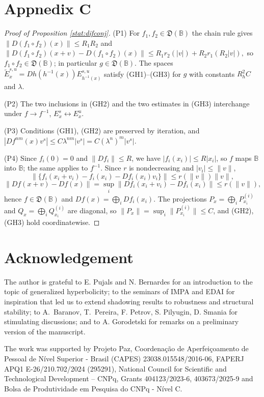 \documentclass[12pt]{article}
\newcommand{\Bb}{\mathbb{B}}
\newcommand{\DUC}{\mathfrak{D}}
\theoremstyle{definition}
\begin{document}
\section*{Appnedix C}
\begin{proof}[Proof of Proposition \ref{stat:difconj}]
{\rm(P1)} For $f_1, f_2 \in \DUC(\Bb)$ the chain rule gives $\|D(f_1 \circ f_2)(x)\| \leq R_1R_2$ and
$
\|D(f_1 \circ f_2)(x+v) - D(f_1 \circ f_2)(x)\| \leq R_1 r_2(|v|) + R_2 r_1(R_2|v|),
$
so $f_1 \circ f_2 \in \DUC(\Bb)$; in particular $g \in \DUC(\Bb)$. The spaces
$\tilde E^{s,u}_x = Dh(h^{-1}(x))E^{s,u}_{h^{-1}(x)}$ satisfy {\rm(GH1)}--{\rm(GH3)} for $g$
with constants $R_h^2C$ and $\lambda$.

{\rm(P2)} The two inclusions in {\rm(GH2)} and the two estimates in {\rm(GH3)} interchange
under $f \to f^{-1}$, $E^s_x \leftrightarrow E^u_x$.

{\rm(P3)} Conditions {\rm(GH1)}, {\rm(GH2)} are preserved by iteration, and
$|Df^{nm}(x)v^s| \leq C\lambda^{nm}|v^s| = C(\lambda^n)^m|v^s|$.

{\rm(P4)} Since $f_i(0) = 0$ and $\|Df_i\| \leq R$, we have $|f_i(x_i)| \leq R|x_i|$, so
$f$ maps $\Bb$ into $\Bb$; the same applies to $f^{-1}$. Since $r$ is nondecreasing and
$|v_i| \leq \|v\|$,
$$
\bigl\|\{f_i(x_i+v_i) - f_i(x_i) - Df_i(x_i)v_i\}\bigr\| \leq r(\|v\|)\|v\|,
$$
$$
\|Df(x+v) - Df(x)\| = \sup_i \|Df_i(x_i+v_i) - Df_i(x_i)\| \leq r(\|v\|),
$$
hence $f \in \DUC(\Bb)$ and $Df(x) = \bigoplus_i Df_i(x_i)$. The projections
$P_x = \bigoplus_i P^{(i)}_{x_i}$ and $Q_x = \bigoplus_i Q^{(i)}_{x_i}$ are diagonal, so
$\|P_x\| = \sup_i \|P^{(i)}_{x_i}\| \leq C$, and {\rm(GH2)}, {\rm(GH3)} hold coordinatewise.
\end{proof}

\section*{Acknowledgement}
The author is grateful to E. Pujals and N. Bernardes for an introduction to the topic of generalized hyperbolicity; to the seminars of IMPA and EDAI for inspiration that led us to extend shadowing results to robustness and structural stability; to A.~Baranov, T.~Pereira, F. Petrov, S. Pilyugin, D. Smania for stimulating discussions; and to A. Gorodetski for remarks on a preliminary version of the manuscript.

The work was supported by Projeto Paz,  Coordenação de Aperfeiçoamento de Pessoal de Nível Superior - Brasil (CAPES) 23038.015548/2016-06,  FAPERJ APQ1 E-26/210.702/2024 (295291), National Council for Scientific and Technological Development – CNPq, Grants 404123/2023-6, 403673/2025-9 and Bolsa de Produtividade em Pesquisa do CNPq - Nível C.
\end{document}
